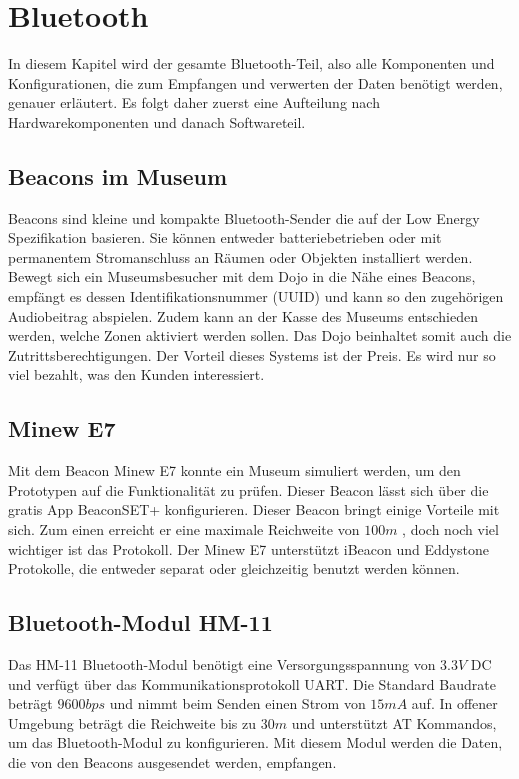 \chapter{Bluetooth}
\label{Bluetooth}
\thispagestyle{fancy} 
In diesem Kapitel wird der gesamte Bluetooth-Teil, also alle Komponenten und Konfigurationen, die zum Empfangen und verwerten der Daten benötigt werden, genauer erläutert. Es folgt daher zuerst eine Aufteilung nach Hardwarekomponenten und danach Softwareteil. 

\section{Beacons im Museum}
Beacons sind kleine und kompakte Bluetooth-Sender die auf der Low Energy Spezifikation basieren. Sie können entweder batteriebetrieben oder mit permanentem Stromanschluss an Räumen oder Objekten installiert werden\cite{TechTag}. Bewegt sich ein Museumsbesucher mit dem Dojo in die Nähe eines Beacons, empfängt es dessen Identifikationsnummer (UUID) und kann so den zugehörigen Audiobeitrag abspielen. Zudem kann an der Kasse des Museums entschieden werden, welche Zonen aktiviert werden sollen. Das Dojo beinhaltet somit auch die Zutrittsberechtigungen. Der Vorteil dieses Systems ist der Preis. Es wird nur so viel bezahlt, was den Kunden interessiert.	

\section{Minew E7}
Mit dem Beacon Minew E7 konnte ein Museum simuliert werden, um den Prototypen auf die Funktionalität zu prüfen. Dieser Beacon lässt sich über die gratis App BeaconSET+ konfigurieren. Dieser Beacon bringt einige Vorteile mit sich. Zum einen erreicht er eine maximale Reichweite von $100m$ , doch noch viel wichtiger ist das Protokoll. Der Minew E7 unterstützt iBeacon und Eddystone Protokolle, die entweder separat oder gleichzeitig benutzt werden können. \cite{beaconshop24}

\section{Bluetooth-Modul HM-11}
Das HM-11 Bluetooth-Modul benötigt eine Versorgungsspannung von $3.3V$ DC und verfügt über das Kommunikationsprotokoll UART. Die Standard Baudrate beträgt $9600bps$ und nimmt beim Senden einen Strom von $15mA$ auf. In offener Umgebung beträgt die Reichweite bis zu $30m$ und unterstützt AT Kommandos, um das Bluetooth-Modul zu konfigurieren. Mit diesem Modul werden die Daten, die von den Beacons ausgesendet werden, empfangen.  

